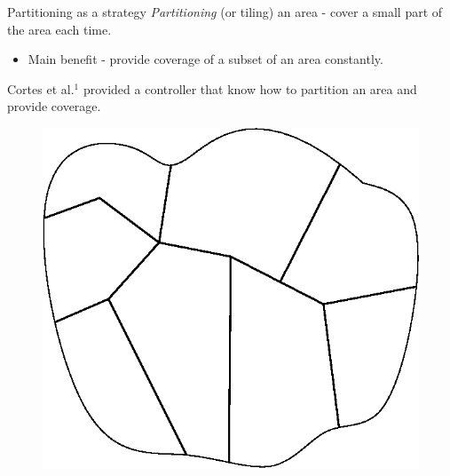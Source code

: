 \documentclass[t]{beamer}
\begin{document}
\begin{frame}[label=motivation12]{Partitioning as a strategy}
\emph{Partitioning} (or tiling) an area - cover a small part of the area each time.
\begin{itemize}
\item Main benefit - provide coverage of a subset of an area constantly.
\end{itemize}

Cortes et al.$^1$ provided a controller that know how to partition an area and provide coverage.

\begin{figure}[b]
\includegraphics[scale=0.4]{motivation/partitioning.eps}
\end{figure}


\end{frame}

\end{document}
